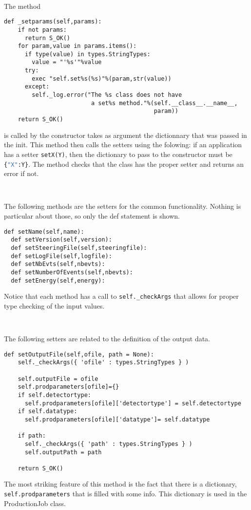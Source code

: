 \documentclass[a4paper,12pt]{article}
\begin{document}
~

The method
\begin{lstlisting}[firstnumber=105]
  def _setparams(self,params):
    if not params:
      return S_OK()
    for param,value in params.items():
      if type(value) in types.StringTypes:
        value = "'%s'"%value
      try:
        exec "self.set%s(%s)"%(param,str(value))
      except:
        self._log.error("The %s class does not have 
                         a set%s method."%(self.__class__.__name__,
                                           param))
    return S_OK()  
\end{lstlisting}
is called by the constructor takes as argument the dictionnary that was passed
in the init. This method then calls the setters using the folowing: if an
application has a setter \lstinline[language=python]!setX(Y)!, 
then the dictionary to pass to the constructor must be
\lstinline[language=python]!{"X":Y}!.
The method checks that the class has the proper setter and returns an error if
not.

~

The following methods are the setters for the common functionality. Nothing is
particular about those, so only the def statement is shown.
\begin{lstlisting}[firstnumber=118,stepnumber=118,numberfirstline=true]
  def setName(self,name):
  def setVersion(self,version):
  def setSteeringFile(self,steeringfile):
  def setLogFile(self,logfile):
  def setNbEvts(self,nbevts):
  def setNumberOfEvents(self,nbevts):
  def setEnergy(self,energy):
\end{lstlisting}
Notice that each method has a call to \lstinline!self._checkArgs! that allows
for proper type checking of the input values.

~

The following setters are related to the definition of the output data.
\begin{lstlisting}[firstnumber=187]
  def setOutputFile(self,ofile, path = None):
    self._checkArgs({ 'ofile' : types.StringTypes } )
    
    self.outputFile = ofile
    self.prodparameters[ofile]={}
    if self.detectortype:
      self.prodparameters[ofile]['detectortype'] = self.detectortype
    if self.datatype:
      self.prodparameters[ofile]['datatype']= self.datatype
    
    if path:
      self._checkArgs({ 'path' : types.StringTypes } )
      self.outputPath = path
      
    return S_OK()  
\end{lstlisting}
The most striking feature of this method is the fact that there is a dictionary,
\lstinline!self.prodparameters! that is filled with some info. This dictionary
is used in the ProductionJob class.
\end{document}
